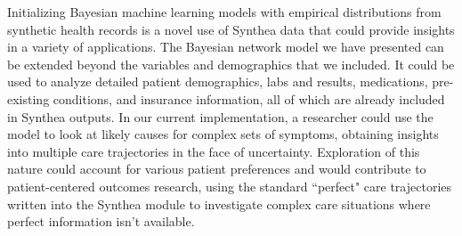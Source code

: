 \documentclass[11pt]{article}
\begin{document}
Initializing Bayesian machine learning models with empirical distributions from synthetic health records is a novel use of Synthea data that could provide insights in a variety of applications.  The Bayesian network model we have presented can be extended beyond the variables and demographics that we included.  It could be used to analyze detailed patient demographics, labs and results, medications, pre-existing conditions, and insurance information, all of which are already included in Synthea outputs.  In our current implementation, a researcher could use the model to look at likely causes for complex sets of symptoms, obtaining insights into multiple care trajectories in the face of uncertainty.  Exploration of this nature could account for various patient preferences and would contribute to patient-centered outcomes research, using the standard ``perfect" care trajectories written into the Synthea module to investigate complex care situations where perfect information isn't available.  

\clearpage






\end{document}
